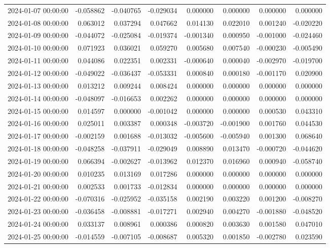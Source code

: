 \begin{tabular}{lrrrrrrr}
2024-01-07 00:00:00 & -0.058862 & -0.040765 & -0.029034 & 0.000000 & 0.000000 & 0.000000 & 0.000000 \\
2024-01-08 00:00:00 & 0.063012 & 0.037294 & 0.047662 & 0.014130 & 0.022010 & 0.001240 & -0.020220 \\
2024-01-09 00:00:00 & -0.044072 & -0.025084 & -0.019374 & -0.001340 & 0.000950 & -0.001000 & -0.024460 \\
2024-01-10 00:00:00 & 0.071923 & 0.036021 & 0.059270 & 0.005680 & 0.007540 & -0.000230 & -0.005490 \\
2024-01-11 00:00:00 & 0.044086 & 0.022351 & 0.002331 & -0.000640 & 0.000040 & -0.002970 & -0.019700 \\
2024-01-12 00:00:00 & -0.049022 & -0.036437 & -0.053331 & 0.000840 & 0.000180 & -0.001170 & 0.020900 \\
2024-01-13 00:00:00 & 0.013212 & 0.009244 & 0.008424 & 0.000000 & 0.000000 & 0.000000 & 0.000000 \\
2024-01-14 00:00:00 & -0.048097 & -0.016653 & 0.002262 & 0.000000 & 0.000000 & 0.000000 & 0.000000 \\
2024-01-15 00:00:00 & 0.014597 & 0.000000 & -0.001042 & 0.000000 & 0.000000 & 0.000530 & 0.043310 \\
2024-01-16 00:00:00 & 0.025011 & 0.003387 & 0.000348 & -0.003720 & -0.001900 & 0.001760 & 0.044530 \\
2024-01-17 00:00:00 & -0.002159 & 0.001688 & -0.013032 & -0.005600 & -0.005940 & 0.001300 & 0.068640 \\
2024-01-18 00:00:00 & -0.048258 & -0.037911 & -0.029049 & 0.008890 & 0.013470 & -0.000720 & -0.044620 \\
2024-01-19 00:00:00 & 0.066394 & -0.002627 & -0.013962 & 0.012370 & 0.016960 & 0.000940 & -0.058740 \\
2024-01-20 00:00:00 & 0.010235 & 0.013169 & 0.017286 & 0.000000 & 0.000000 & 0.000000 & 0.000000 \\
2024-01-21 00:00:00 & 0.002533 & 0.001733 & -0.012834 & 0.000000 & 0.000000 & 0.000000 & 0.000000 \\
2024-01-22 00:00:00 & -0.070316 & -0.025952 & -0.035158 & 0.002190 & 0.003220 & 0.001200 & -0.008270 \\
2024-01-23 00:00:00 & -0.036458 & -0.008881 & -0.017271 & 0.002940 & 0.004270 & -0.001880 & -0.048520 \\
2024-01-24 00:00:00 & 0.033137 & 0.008961 & 0.000386 & 0.000820 & 0.003630 & 0.001580 & 0.047010 \\
2024-01-25 00:00:00 & -0.014559 & -0.007105 & -0.008687 & 0.005320 & 0.001850 & -0.002780 & 0.023590 \\

\end{tabular}
